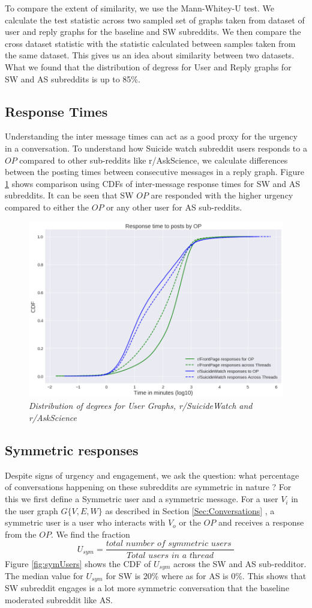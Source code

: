 To compare the extent of similarity, we use the Mann-Whitey-U test. We calculate the test statistic across two sampled set of graphs taken from dataset of user and reply graphs for the baseline and SW subreddits. We then compare the cross dataset statistic with the statistic calculated between samples taken from the same dataset. This gives us an idea about similarity between two datasets. What we found that the distribution of degress for User and Reply graphs for SW and AS subreddits is up to 85\%. 

\subsection{Response Times}
Understanding the inter message times can act as a good proxy for the urgency in a conversation. To understand how Suicide watch subreddit users responds to a $OP$ compared to other sub-reddits like r/AskScience, we calculate differences between the posting times between consecutive messages in a reply graph. Figure \ref{fig:responseTimeDist} shows comparison using CDFs of inter-message response times for SW and AS subreddits. It can be seen that SW $OP$ are responded with the higher urgency compared to either the $OP$ or any other user for AS sub-reddits. 

\begin{figure}[!h]
	\centering
	\includegraphics[width=0.5\columnwidth]{Figures/respTimeDist}
	\caption{\textsl{ Distribution of degrees for User Graphs,  r/SuicideWatch and r/AskScience }}
	\label{fig:responseTimeDist}
\end{figure}

\subsection{Symmetric responses}
Despite signs of urgency and engagement, we ask the question: what percentage of conversations happening on these subreddits are symmetric in nature ? 
For this we first define a Symmetric user and a symmetric message. For a user $V_i$ in the user graph $G\{V,E,W\}$ as described in Section \ref{Sec:Conversations} , a symmetric user is a user who interacts with $V_o$ or the $OP$ and receives a response from the $OP$. We find the fraction $$U_{sym}=\frac{\textit{total number of symmetric users }}{\textit{Total users in a thread}}$$
Figure \ref{fig:symUsers} shows the CDF of $U_{sym}$ across the SW and AS sub-redditor.  The median value for $U_{sym}$ for SW is 20\% where as for AS is 0\%. This shows that SW subreddit engages is a lot more symmetric conversation that the baseline moderated subreddit like AS.

